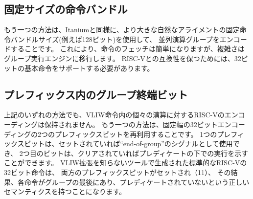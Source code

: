\subsection*{固定サイズの命令バンドル}

\begin{comment}
Another approach, similar to Itanium, is to use a larger naturally
aligned fixed instruction bundle size (e.g., 128 bits) across which
parallel operation groups are encoded.  This simplifies instruction
fetch, but shifts the complexity to the group execution engine.  To
remain RISC-V compatible, the base 32-bit instruction would still have
to be supported.
\end{comment}
もう一つの方法は、Itaniumと同様に、より大きな自然なアライメントの固定命令バンドルサイズ(例えば128ビット)を使用して、
並列演算グループをエンコードすることです。
これにより、命令のフェッチは簡単になりますが、複雑さはグループ実行エンジンに移行します。
RISC-Vとの互換性を保つためには、32ビットの基本命令をサポートする必要があります。

\begin{comment}
\subsection*{End-of-Group bits in Prefix}
\end{comment}
\subsection*{プレフィックス内のグループ終端ビット}

\begin{comment}
None of the above approaches retains the RISC-V encoding for the
individual operations within a VLIW instruction.  Yet another approach
is to repurpose the two prefix bits in the fixed-width 32-bit
encoding.  One prefix bit can be used to signal ``end-of-group'' if
set, while the second bit could indicate execution under a predicate
if clear.  Standard RISC-V 32-bit instructions generated by tools
unaware of the VLIW extension would have both prefix bits set (11) and
thus have the correct semantics, with each instruction at the end of a
group and not predicated.
\end{comment}
上記のいずれの方法でも、VLIW命令内の個々の演算に対するRISC-Vのエンコーディングは保持されません。
もう一つの方法は、固定幅の32ビットエンコーディングの2つのプレフィックスビットを再利用することです。
1つのプレフィックスビットは、セットされていれば``end-of-group''のシグナルとして使用でき、
2つ目のビットは、クリアされていればプレディケートの下での実行を示すことができます。
VLIW拡張を知らないツールで生成された標準的なRISC-Vの32ビット命令は、
両方のプレフィックスビットがセットされ（11）、
その結果、各命令がグループの最後にあり、プレディケートされていないという正しいセマンティクスを持つことになります。

